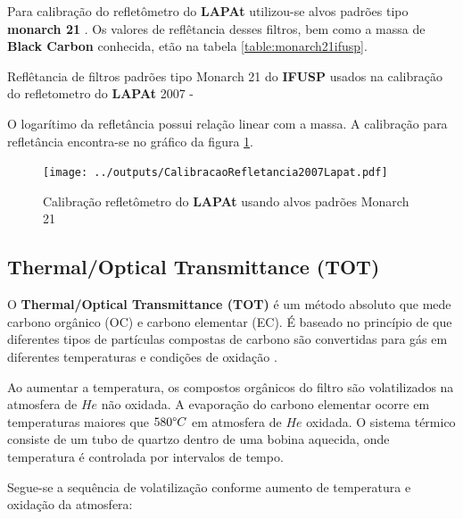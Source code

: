 Para calibração do refletômetro do \textbf{LAPAt} utilizou-se alvos padrões
tipo \textbf{monarch 21} \citep{clarke1986}. Os valores de reflêtancia 
desses filtros, bem como a massa de \textbf{Black Carbon} conhecida,
etão na tabela \ref{table:monarch21ifusp}.

\begin{table}[H]
 \centering
  \begin{scriptsize}
    
  \end{scriptsize}
  \caption{Reflêtancia de filtros padrões tipo Monarch 21 \citep{clarke1986} 
           do \textbf{IFUSP} usados na calibração do refletometro do 
           \textbf{LAPAt} 2007 - \label{table:monarch21ifusp}}
\end{table}

O logarítimo da refletância possui relação linear com a massa.
A calibração para refletância encontra-se no gráfico da figura 
\ref{fig:mocarch21calib}. 

\begin{figure}[H]
  \centering
  \texttt{[image: ../outputs/CalibracaoRefletancia2007Lapat.pdf]}
  \caption{Calibração refletômetro do \textbf{LAPAt} usando alvos padrões Monarch 21
          \label{fig:mocarch21calib}}
\end{figure}

\subsection{Thermal/Optical Transmittance (TOT)}

O \textbf{Thermal/Optical Transmittance (TOT)} é um método absoluto
que mede carbono orgânico (OC) e carbono elementar (EC).
É baseado no princípio  de que diferentes tipos de partículas
compostas de carbono são convertidas para gás em diferentes temperaturas e condições
de oxidação \citep{birch1998}.

Ao aumentar a temperatura, os compostos orgânicos do filtro são volatilizados 
na atmosfera de $He$ não oxidada.
A evaporação do carbono elementar ocorre em temperaturas maiores que 
$580 \degree C$ em atmosfera de $He$ oxidada.
O sistema térmico consiste de um tubo de quartzo dentro de uma bobina aquecida, 
onde temperatura é controlada por intervalos de tempo.  

Segue-se a sequência de volatilização conforme aumento de temperatura e 
oxidação da atmosfera:

